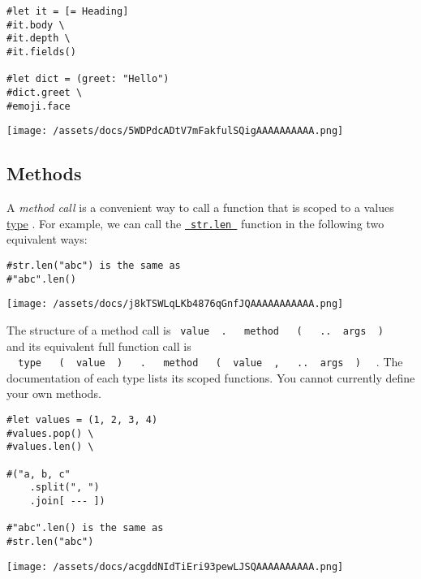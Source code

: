 \begin{verbatim}
#let it = [= Heading]
#it.body \
#it.depth \
#it.fields()

#let dict = (greet: "Hello")
#dict.greet \
#emoji.face
\end{verbatim}

\texttt{[image: /assets/docs/5WDPdcADtV7mFakfulSQigAAAAAAAAAA.png]}

\subsection{Methods}\label{methods}

A \emph{method call} is a convenient way to call a function that is
scoped to a value\textquotesingle s
\href{/docs/reference/foundations/type/}{type} . For example, we can
call the
\href{/docs/reference/foundations/str/\#definitions-len}{\texttt{\ str.len\ }}
function in the following two equivalent ways:

\begin{verbatim}
#str.len("abc") is the same as
#"abc".len()
\end{verbatim}

\texttt{[image: /assets/docs/j8kTSWLqLKb4876qGnfJQAAAAAAAAAAA.png]}

The structure of a method call is
\texttt{\ value\ }{\texttt{\ .\ }}\texttt{\ }{\texttt{\ method\ }}\texttt{\ }{\texttt{\ (\ }}\texttt{\ }{\texttt{\ ..\ }}\texttt{\ args\ }{\texttt{\ )\ }}\texttt{\ }
and its equivalent full function call is
\texttt{\ }{\texttt{\ type\ }}\texttt{\ }{\texttt{\ (\ }}\texttt{\ value\ }{\texttt{\ )\ }}\texttt{\ }{\texttt{\ .\ }}\texttt{\ }{\texttt{\ method\ }}\texttt{\ }{\texttt{\ (\ }}\texttt{\ value\ }{\texttt{\ ,\ }}\texttt{\ }{\texttt{\ ..\ }}\texttt{\ args\ }{\texttt{\ )\ }}\texttt{\ }
. The documentation of each type lists it\textquotesingle s scoped
functions. You cannot currently define your own methods.

\begin{verbatim}
#let values = (1, 2, 3, 4)
#values.pop() \
#values.len() \

#("a, b, c"
    .split(", ")
    .join[ --- ])

#"abc".len() is the same as
#str.len("abc")
\end{verbatim}

\texttt{[image: /assets/docs/acgddNIdTiEri93pewLJSQAAAAAAAAAA.png]}

